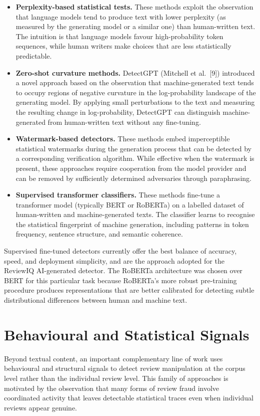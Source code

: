\documentclass[12pt,a4paper,oneside]{report}
\begin{document}
\begin{itemize}[leftmargin=*]
  \item \textbf{Perplexity-based statistical tests.} These methods
        exploit the observation that language models tend to produce text
        with lower perplexity (as measured by the generating model or a
        similar one) than human-written text. The intuition is that
        language models favour high-probability token sequences, while
        human writers make choices that are less statistically predictable.
  \item \textbf{Zero-shot curvature methods.} DetectGPT (Mitchell et al.~[9]) introduced a novel approach based on the observation that
        machine-generated text tends to occupy regions of negative
        curvature in the log-probability landscape of the generating
        model. By applying small perturbations to the text and measuring
        the resulting change in log-probability, DetectGPT can distinguish
        machine-generated from human-written text without any fine-tuning.
  \item \textbf{Watermark-based detectors.} These methods embed
        imperceptible statistical watermarks during the generation process
        that can be detected by a corresponding verification algorithm.
        While effective when the watermark is present, these approaches
        require cooperation from the model provider and can be removed by
        sufficiently determined adversaries through paraphrasing.
  \item \textbf{Supervised transformer classifiers.} These methods
        fine-tune a transformer model (typically BERT or RoBERTa) on a
        labelled dataset of human-written and machine-generated texts.
        The classifier learns to recognise the statistical fingerprint of
        machine generation, including patterns in token frequency,
        sentence structure, and semantic coherence.
\end{itemize}

Supervised fine-tuned detectors currently offer the best
balance of accuracy, speed, and deployment simplicity, and are the
approach adopted for the ReviewIQ AI-generated detector. The RoBERTa
architecture was chosen over BERT for this particular task because
RoBERTa's more robust pre-training procedure produces representations
that are better calibrated for detecting subtle distributional
differences between human and machine text.

\section{Behavioural and Statistical Signals}
Beyond textual content, an important complementary line of work uses
behavioural and structural signals to detect review manipulation at the
corpus level rather than the individual review level. This family of
approaches is motivated by the observation that many forms of review fraud
involve coordinated activity that leaves detectable statistical traces even
when individual reviews appear genuine.
\end{document}
